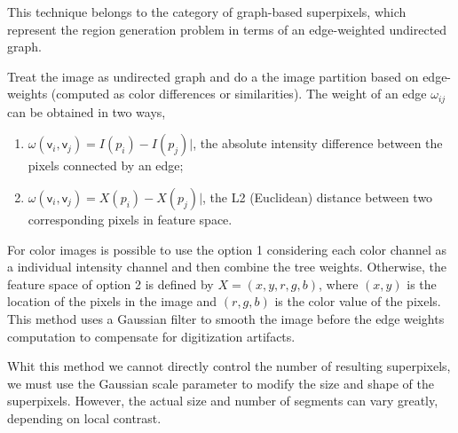 This technique belongs to the category of graph-based superpixels, which represent the region generation problem in terms of an edge-weighted undirected graph. 

Treat the image as undirected graph and do a the image partition based on edge-weights  (computed as color differences or similarities). The weight of an edge  $\omega_{ij}$
can be obtained in two ways,
\begin{enumerate}
	\item $\omega(\mathsf{v}_i, \mathsf{v}_j)= I(p_i) - I(p_j)|$, the absolute intensity difference between the pixels connected by an edge; 
	\item $\omega(\mathsf{v}_i, \mathsf{v}_j)= X(p_i) - X(p_j)|$, the L2 (Euclidean)
distance between two corresponding pixels in feature space.
\end{enumerate}

For color images is possible to use the option 1 considering each color channel as a individual intensity channel and then combine the tree weights. Otherwise, the feature space of option 2 is defined by $X = (x, y,r, g, b)$, where $(x, y)$ is the location of the pixels in the image and $(r, g, b)$ is the color value of the pixels. This method uses a Gaussian filter to smooth the image before the edge weights computation to compensate for digitization artifacts. 

Whit this method we cannot directly control the number of resulting superpixels, we must use the Gaussian scale parameter to modify the size and shape of the superpixels. However, the actual size and number of segments can vary greatly, depending on local contrast.

